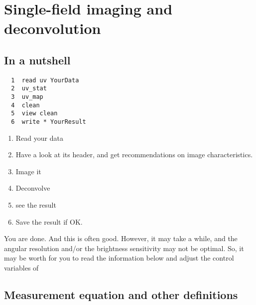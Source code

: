 \section{Single-field imaging and deconvolution}
\label{sec:single}

\subsection{In a nutshell}

\begin{verbatim}
  1  read uv YourData
  2  uv_stat
  3  uv_map
  4  clean
  5  view clean
  6  write * YourResult
\end{verbatim}
\begin{enumerate}\itemsep 0pt
\item Read your \uv{} data
\item Have a look at its header, and get recommendations on
image characteristics.
\item Image it
\item Deconvolve
\item see the result
\item Save the result if OK.
\end{enumerate}
You are done. And this is often good. However, it may take a while, and
the angular resolution and/or the brightness sensitivity may not be optimal.
So, it may be worth for you to read the information below and adjust
the control variables of  

\subsection{Measurement equation and other definitions}
\label{sub:single:principle}


